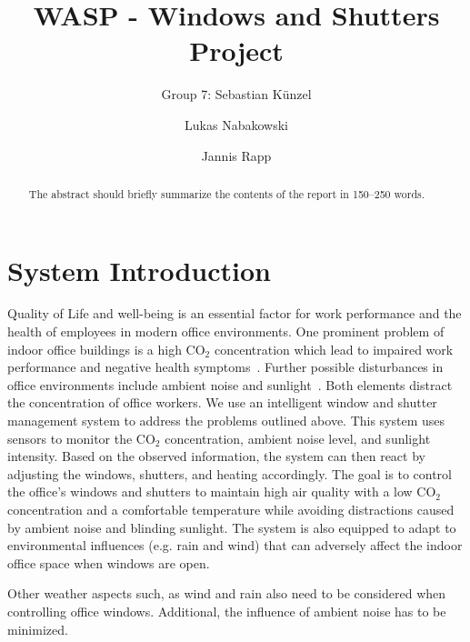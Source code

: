\documentclass[runningheads]{llncs}
\begin{document}
%
\title{WASP - Windows and Shutters Project}

\author{Group 7: Sebastian Künzel \and
Lukas Nabakowski \and
Jannis Rapp}

%
\maketitle              %
%
\begin{abstract}
The abstract should briefly summarize the contents of the report in
150--250 words. 

\end{abstract}
%
%
%
\section{System Introduction}



Quality of Life and well-being is an essential factor for work performance and the health of employees in modern office environments. One prominent problem of indoor office buildings is a high CO$_2$ concentration which lead to impaired work performance and negative health symptoms~\cite{indoor_polutionCO2}. Further possible disturbances in office environments include ambient noise and sunlight~\cite{indoor_noiselight}. Both elements distract the concentration of office workers. 
\newline
We use an intelligent window and shutter management system to address the problems outlined above.
This system uses sensors to monitor the CO$_2$ concentration, ambient noise level, and sunlight intensity.
Based on the observed information, the system can then react by adjusting the windows, shutters, and heating accordingly.
\newline
The goal is to control the office's windows and shutters to maintain high air quality with a low CO$_2$ concentration and a comfortable temperature while avoiding distractions caused by ambient noise and blinding sunlight. The system is also equipped to adapt to environmental influences (e.g. rain and wind) that can adversely affect the indoor office space when windows are open.   




Other weather aspects such, as wind and rain also need to be considered when controlling office windows. Additional, the influence of ambient noise has to be minimized. 
\end{document}
